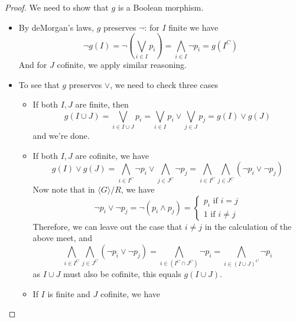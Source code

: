 \begin{proof}
  We need to show that $g$ is a Boolean morphism. 
  \begin{itemize}
    \item 
      By deMorgan's laws, $g$ preserves $\neg$:
      for $I$ finite we have
      \begin{equation}
      \neg g(I) = \neg (\bigvee_{i\in I} p_i) = \bigwedge_{i\in I} \neg p_i = g(I^C)
      \end{equation}
      And for $J$ cofinite, we apply similar reasoning. 
    \item To see that $g$ preserves $\vee$, we need to check three cases
      \begin{itemize}
        \item If both $I,J$ are finite, then 
        \begin{equation} 
          g(I \cup J) = \bigvee_{i\in I \cup J} p_i= \bigvee_{i\in I} p_i \vee \bigvee_{j\in J} p_j 
          = g(I) \vee g(J)
        \end{equation}
        and we're done. 
      \item If both $I,J$ are cofinite, we have
        \begin{equation}
          g(I) \vee g(J) = 
          \bigwedge_{i \in I^C} \neg p_i \vee 
          \bigwedge_{j \in J^C} \neg p_j 
          = 
          \bigwedge_{i\in I^C} 
          \bigwedge_{j \in J^C}(\neg p_i \vee  \neg p_j) 
        \end{equation}
        Now note that in $\langle G \rangle / R$, we have 
        \begin{equation}
          \neg p_i \vee \neg p_j = \neg ( p_i \wedge p_j) = 
          \begin{cases}
            p_i \text{ if } i = j\\
            1 \text{ if } i \neq j  
          \end{cases}
        \end{equation}
        Therefore, we can leave out the case that $i\neq j$ in the calculation of the above meet, and
        \begin{equation}
          \bigwedge_{i\in I^C} 
          \bigwedge_{j \in J^C}(\neg p_i \vee  \neg p_j)  
          = 
          \bigwedge_{i \in (I^C \cap J^C)} \neg p_i
          = 
          \bigwedge_{i \in (I \cup J)^C} \neg p_i 
        \end{equation}
        as $I\cup J$ must also be cofinite, this equals 
          $ g( I \cup J)$. 
        \item 
          If $I$ is finite and $J$ cofinite, we have 

\end{itemize}
\end{itemize}
\end{proof}
